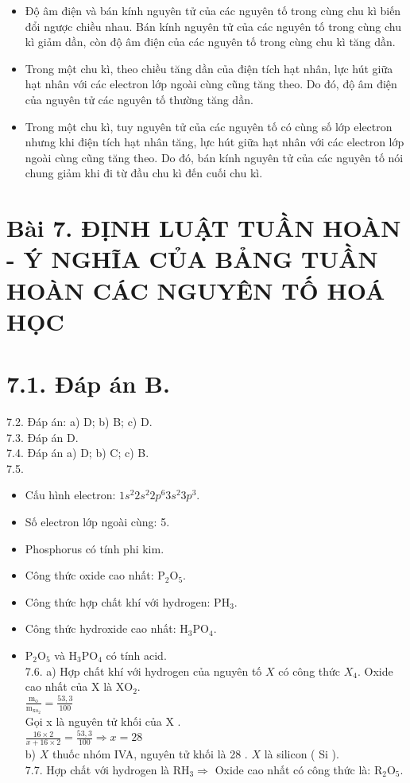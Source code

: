 \documentclass[10pt]{article}
\begin{document}
\begin{itemize}
  \item Độ âm điện và bán kính nguyên tử của các nguyên tố trong cùng chu kì biến đổi ngược chiều nhau. Bán kính nguyên tử của các nguyên tố trong cùng chu kì giảm dần, còn độ âm điện của các nguyên tố trong cùng chu kì tăng dần.
  \item Trong một chu kì, theo chiều tăng dần của điện tích hạt nhân, lực hút giữa hạt nhân với các electron lớp ngoài cùng cũng tăng theo. Do đó, độ âm điện của nguyên tử các nguyên tố thường tăng dần.
  \item Trong một chu kì, tuy nguyên tử của các nguyên tố có cùng số lớp electron nhưng khi điện tích hạt nhân tăng, lực hút giữa hạt nhân với các electron lớp ngoài cùng cũng tăng theo. Do đó, bán kính nguyên tử của các nguyên tố nói chung giảm khi đi từ đầu chu kì đến cuối chu kì.
\end{itemize}

\section*{Bài 7. ĐỊNH LUẬT TUẦN HOÀN - Ý NGHĨA CỦA BẢNG TUẦN HOÀN CÁC NGUYÊN TỐ HOÁ HỌC}
\section*{7.1. Đáp án B.}
7.2. Đáp án: a) D; b) B; c) D.\\
7.3. Đáp án D.\\
7.4. Đáp án a) D; b) C; c) B.\\
7.5.

\begin{itemize}
  \item Cấu hình electron: $1 s^{2} 2 s^{2} 2 p^{6} 3 s^{2} 3 p^{3}$.
  \item Số electron lớp ngoài cùng: 5.
  \item Phosphorus có tính phi kim.
  \item Công thức oxide cao nhất: $\mathrm{P}_{2} \mathrm{O}_{5}$.
  \item Công thức hợp chất khí với hydrogen: $\mathrm{PH}_{3}$.
  \item Công thức hydroxide cao nhất: $\mathrm{H}_{3} \mathrm{PO}_{4}$.
  \item $\mathrm{P}_{2} \mathrm{O}_{5}$ và $\mathrm{H}_{3} \mathrm{PO}_{4}$ có tính acid.\\
7.6. a) Hợp chất khí với hydrogen của nguyên tố $X$ có công thức $X_{4}$. Oxide cao nhất của X là $\mathrm{XO}_{2}$.\\
$\frac{\mathrm{m}_{\mathrm{o}}}{\mathrm{m}_{\mathrm{xo}_{2}}}=\frac{53,3}{100}$\\
Gọi x là nguyên tử khối của X .\\
$\frac{16 \times 2}{x+16 \times 2}=\frac{53,3}{100} \Rightarrow x=28$\\
b) $X$ thuốc nhóm IVA, nguyên tử khối là 28 . $X$ là silicon ( Si ).\\
7.7. Hợp chất với hydrogen là $\mathrm{RH}_{3} \Rightarrow$ Oxide cao nhất có công thức là: $\mathrm{R}_{2} \mathrm{O}_{5}$.
\end{itemize}
\end{document}
